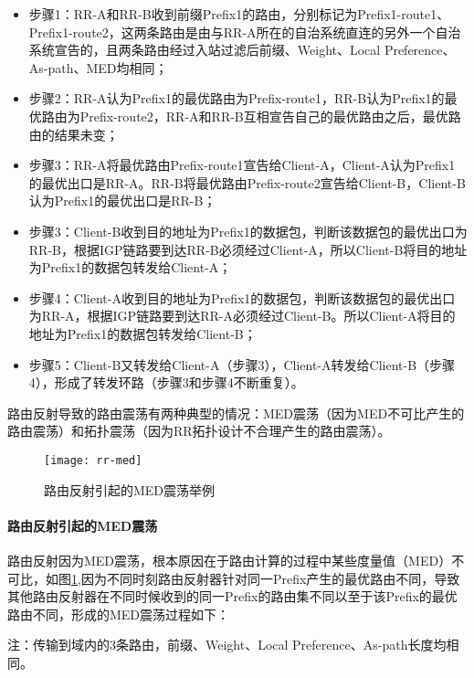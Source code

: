 \begin{itemize}
\item 步骤1：RR-A和RR-B收到前缀Prefix1的路由，分别标记为Prefix1-route1、Prefix1-route2，这两条路由是由与RR-A所在的自治系统直连的另外一个自治系统宣告的，且两条路由经过入站过滤后前缀、Weight、Local Preference、As-path、MED均相同；
\item 步骤2：RR-A认为Prefix1的最优路由为Prefix-route1，RR-B认为Prefix1的最优路由为Prefix-route2，RR-A和RR-B互相宣告自己的最优路由之后，最优路由的结果未变；
\item 步骤3：RR-A将最优路由Prefix-route1宣告给Client-A，Client-A认为Prefix1的最优出口是RR-A。RR-B将最优路由Prefix-route2宣告给Client-B，Client-B认为Prefix1的最优出口是RR-B；
\item 步骤3：Client-B收到目的地址为Prefix1的数据包，判断该数据包的最优出口为RR-B，根据IGP链路要到达RR-B必须经过Client-A，所以Client-B将目的地址为Prefix1的数据包转发给Client-A；
\item 步骤4：Client-A收到目的地址为Prefix1的数据包，判断该数据包的最优出口为RR-A，根据IGP链路要到达RR-A必须经过Client-B。所以Client-A将目的地址为Prefix1的数据包转发给Client-B；
\item 步骤5：Client-B又转发给Client-A（步骤3），Client-A转发给Client-B（步骤4），形成了转发环路（步骤3和步骤4不断重复）。
\end{itemize}



路由反射导致的路由震荡有两种典型的情况：MED震荡（因为MED不可比产生的路由震荡）和拓扑震荡（因为RR拓扑设计不合理产生的路由震荡）。


\begin{figure}
  \centering
  \texttt{[image: rr-med]}
  \caption{路由反射引起的MED震荡举例\cite{Flavel2009Stable}}
  \label{fig:rr-med}
\end{figure}

\paragraph{路由反射引起的MED震荡}

路由反射因为MED震荡，根本原因在于路由计算的过程中某些度量值（MED）不可比，如图\ref{fig:rr-med},因为不同时刻路由反射器针对同一Prefix产生的最优路由不同，导致其他路由反射器在不同时候收到的同一Prefix的路由集不同以至于该Prefix的最优路由不同，形成的MED震荡过程如下：

注：传输到域内的3条路由，前缀、Weight、Local Preference、As-path长度均相同。

